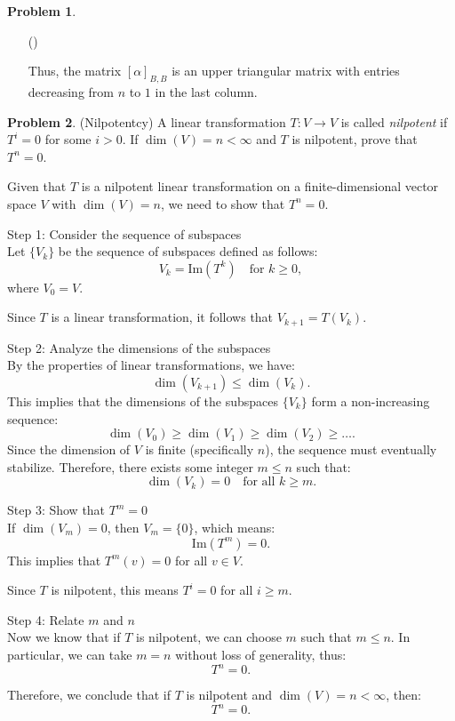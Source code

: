 \documentclass[12pt]{article}
\theoremstyle{definition}
\newtheorem{problem}{Problem}
\newcounter{subq}[problem]
\newenvironment{subproblem}
{\refstepcounter{subq} \begin{itemize} \item[(\alph{subq})]}
{\end{itemize} \medskip}
\begin{document}
\begin{problem}
\begin{subproblem}
\begin{solution}
            Thus, the matrix \( [\alpha]_{B,B} \) is an upper triangular matrix with entries decreasing from \( n \) to \( 1 \) in the last column.

        \end{solution}
    \end{subproblem}
\end{problem}

\begin{problem}
    (Nilpotentcy) A linear transformation $T: V \rightarrow V$ is called \textit{nilpotent} if $T^i = 0$ for some $i > 0$.
    If $\dim(V) = n < \infty$ and $T$ is nilpotent, prove that $T^n = 0$.

    \begin{solution}
        Given that \( T \) is a nilpotent linear transformation on a finite-dimensional vector space \( V \) with \( \dim(V) = n \), we need to show that \( T^n = 0 \).

        Step 1: Consider the sequence of subspaces\\
        Let \( \{ V_k \} \) be the sequence of subspaces defined as follows:
        \[
        V_k = \text{Im}(T^k) \quad \text{for } k \geq 0,
        \]
        where \( V_0 = V \).

        Since \( T \) is a linear transformation, it follows that \( V_{k+1} = T(V_k) \).

        Step 2: Analyze the dimensions of the subspaces\\
        By the properties of linear transformations, we have:
        \[
        \dim(V_{k+1}) \leq \dim(V_k).
        \]
        This implies that the dimensions of the subspaces \( \{ V_k \} \) form a non-increasing sequence:
        \[
        \dim(V_0) \geq \dim(V_1) \geq \dim(V_2) \geq \ldots.
        \]
        Since the dimension of \( V \) is finite (specifically \( n \)), the sequence must eventually stabilize. Therefore, there exists some integer \( m \leq n \) such that:
        \[
        \dim(V_k) = 0 \quad \text{for all } k \geq m.
        \]

        Step 3: Show that \( T^m = 0 \)\\
        If \( \dim(V_m) = 0 \), then \( V_m = \{0\} \), which means:
        \[
        \text{Im}(T^m) = 0.
        \]
        This implies that \( T^m(v) = 0 \) for all \( v \in V \).

        Since \( T \) is nilpotent, this means \( T^i = 0 \) for all \( i \geq m \).

        Step 4: Relate \( m \) and \( n \)\\
        Now we know that if \( T \) is nilpotent, we can choose \( m \) such that \( m \leq n \). In particular, we can take \( m = n \) without loss of generality, thus:
        \[
        T^n = 0.
        \]

        Therefore, we conclude that if \( T \) is nilpotent and \( \dim(V) = n < \infty \), then:
        \[
        T^n = 0.
        \]
    \end{solution}
\end{problem}
\end{document}
